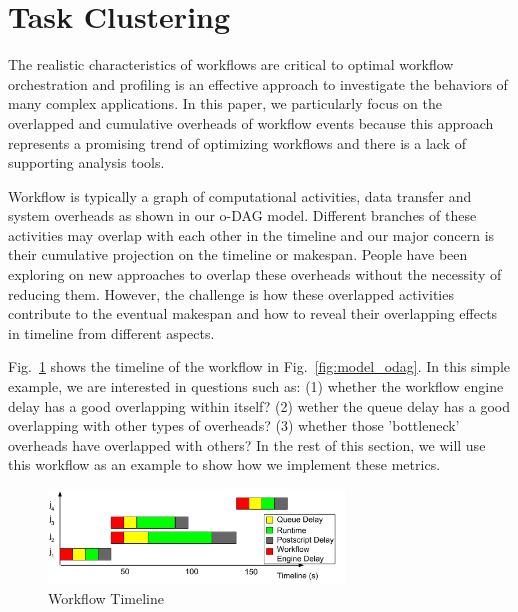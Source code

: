 \section{Task Clustering}
\label{sec:clustering}

The realistic characteristics of workflows are critical to optimal workflow orchestration and profiling is an effective approach to investigate the behaviors of many complex applications. In this paper, we particularly focus on the overlapped and cumulative overheads of workflow events because this approach represents a promising trend of optimizing workflows and there is a lack of supporting analysis tools.

Workflow is typically a graph of computational activities, data transfer and system overheads as shown in our o-DAG model. Different branches of these activities may overlap with each other in the timeline and our major concern is their cumulative projection on the timeline or makespan. People have been exploring on new approaches to overlap these overheads without the necessity of reducing them. However, the challenge is how these overlapped activities contribute to the eventual makespan and how to reveal their overlapping effects in timeline from different aspects.  


Fig.~\ref{fig:profiling_overhead_timeline} shows the timeline of the workflow in Fig.~\ref{fig:model_odag}. In this simple example, we are interested in questions such as: (1) whether the workflow engine delay has a good overlapping within itself? (2) wether the queue delay has a good overlapping with other types of overheads? (3) whether those 'bottleneck' overheads have overlapped with others? In the rest of this section, we will use this workflow as an example to show how we implement these metrics. 

\begin{figure}[!htb]
	\centering
    \includegraphics[width=0.7\textwidth]{figures/profiling/overhead_timeline.pdf}
    \caption{Workflow Timeline}
    \label{fig:profiling_overhead_timeline}
\end{figure}

